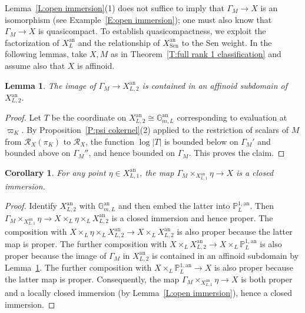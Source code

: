 \documentclass[12pt]{article}
\newtheorem{lemma}[theorem]{Lemma}
\newtheorem{cor}[theorem]{Corollary}
\theoremstyle{definition}
\numberwithin{equation}{theorem}
\newcommand{\calR}{\mathcal{R}}
\newcommand{\an}{\mathrm{an}}
\begin{document}
Lemma~\ref{L:open immersion}(1) does not suffice to imply that $\Gamma_M \to X$ is an isomorphism (see Example~\ref{E:open immersion}); one must also know that $\Gamma_M \to X$ is quasicompact.
To establish quasicompactness, we exploit the factorization of $X^{\an}_L$
and the relationship of $X^{\an}_{\mathrm{Sen}}$ to the Sen weight.
In the following lemmas, take $X,M$ as in Theorem~\ref{T:full rank 1 classification} and assume also that $X$ is affinoid.
\begin{lemma} \label{L:affinoid image2}
The image of $\Gamma_M \to X^{\an}_{L,2}$ is contained in an affinoid subdomain of $X^{\an}_{L,2}$.
\end{lemma}
\begin{proof}
Let $T$ be the coordinate on $X^{\an}_{L,2} \cong \mathbb{G}^{\an}_{m,L}$ corresponding to evaluation at $\varpi_K$. By Proposition~\ref{P:psi cokernel}(2) applied to the restriction of scalars of $M$ from $\calR_X(\pi_K)$ to $\calR_X$, the function $\log |T|$ is bounded below on $\Gamma_M'$
and bounded above on $\Gamma_M''$, and hence bounded on $\Gamma_M$. This proves the claim.
\end{proof}
\begin{cor} \label{C:closed immersion}
For any point $\eta \in X^{\an}_{L,1}$, the map
$\Gamma_M \times_{X^{\an}_{L,1}} \eta \to X$ is a closed immersion.
\end{cor}
\begin{proof}
Identify $X^{\an}_{L,2}$ with $\mathbb{G}^{\an}_{m,L}$ and then embed the latter into $\mathbb{P}^{1,\an}_L$. Then $\Gamma_M \times_{X^{\an}_{L,1}} \eta \to X \times_L \eta \times_L X^{\an}_{L,2}$ is a closed immersion and hence proper. The composition with $X \times_L \eta \times_L X^{\an}_{L,2} \to X \times_L X^{\an}_{L,2}$ is also proper because the latter map is proper. The further composition with $X \times_L X^{\an}_{L,2} \to X \times_L \mathbb{P}^{1,\an}_L$ is also proper because the image
of $\Gamma_M$ in $X^{\an}_{L,2}$ is contained in an affinoid subdomain by Lemma~\ref{L:affinoid image2}. The further composition with $X \times_L \mathbb{P}^{1,\an}_L \to X$ is also proper because the latter map is proper. 
Consequently, the map $\Gamma_M \times_{X^{\an}_{L,1}} \eta \to X$ is both proper and a locally closed immersion (by Lemma~\ref{L:open immersion}), hence a closed immersion.
\end{proof}
\end{document}
